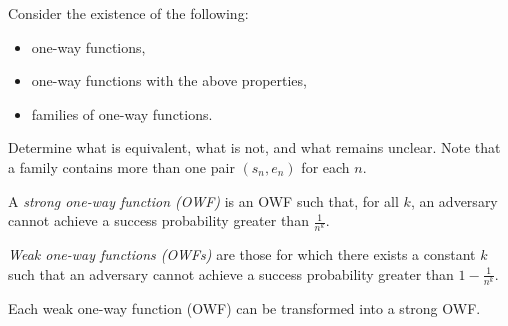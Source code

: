 \begin{exercise}
    Consider the existence of the following:
    \begin{itemize}
        \item one-way functions,
        \item one-way functions with the above properties,
        \item families of one-way functions.
    \end{itemize}
    Determine what is equivalent, what is not, and what remains unclear.
    Note that a family contains more than one pair $(s_n, e_n)$ for each $n$.
\end{exercise}

\begin{definition}
    A \emph{strong one-way function (OWF)} is an OWF such that, for all $k$, an adversary cannot achieve a success probability greater than $\frac{1}{n^k}$.

    \emph{Weak one-way functions (OWFs)} are those for which there exists a constant $k$ such that an adversary cannot achieve a success probability greater than $1 - \frac{1}{n^{k}}$.
\end{definition}

\begin{theorem}
    Each weak one-way function (OWF) can be transformed into a strong OWF.
\end{theorem}

